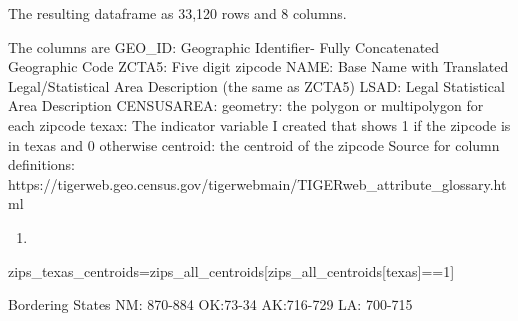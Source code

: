 \documentclass[
  letterpaper,
  DIV=11,
  numbers=noendperiod]{scrartcl}
\newenvironment{Shaded}{\begin{snugshade}}{\end{snugshade}}
\newcommand{\DecValTok}[1]{\textcolor[rgb]{0.68,0.00,0.00}{#1}}
\newcommand{\NormalTok}[1]{\textcolor[rgb]{0.00,0.23,0.31}{#1}}
\newcommand{\OperatorTok}[1]{\textcolor[rgb]{0.37,0.37,0.37}{#1}}
\newcommand{\StringTok}[1]{\textcolor[rgb]{0.13,0.47,0.30}{#1}}
\providecommand{\tightlist}{%
  \setlength{\itemsep}{0pt}\setlength{\parskip}{0pt}}\usepackage{longtable,booktabs,array}
\begin{document}
The resulting dataframe as 33,120 rows and 8 columns.

The columns are GEO\_ID: Geographic Identifier- Fully Concatenated
Geographic Code ZCTA5: Five digit zipcode NAME: Base Name with
Translated Legal/Statistical Area Description (the same as ZCTA5) LSAD:
Legal Statistical Area Description CENSUSAREA: geometry: the polygon or
multipolygon for each zipcode texax: The indicator variable I created
that shows 1 if the zipcode is in texas and 0 otherwise centroid: the
centroid of the zipcode Source for column definitions:
https://tigerweb.geo.census.gov/tigerwebmain/TIGERweb\_attribute\_glossary.html

\begin{enumerate}
\def\labelenumi{\arabic{enumi}.}
\setcounter{enumi}{1}
\tightlist
\item
\end{enumerate}

\begin{Shaded}
\begin{Highlighting}[]
\NormalTok{zips\_texas\_centroids}\OperatorTok{=}\NormalTok{zips\_all\_centroids[zips\_all\_centroids[}\StringTok{\textquotesingle{}texas\textquotesingle{}}\NormalTok{]}\OperatorTok{==}\DecValTok{1}\NormalTok{]}
\end{Highlighting}
\end{Shaded}

Bordering States NM: 870-884 OK:73-34 AK:716-729 LA: 700-715
\end{document}
